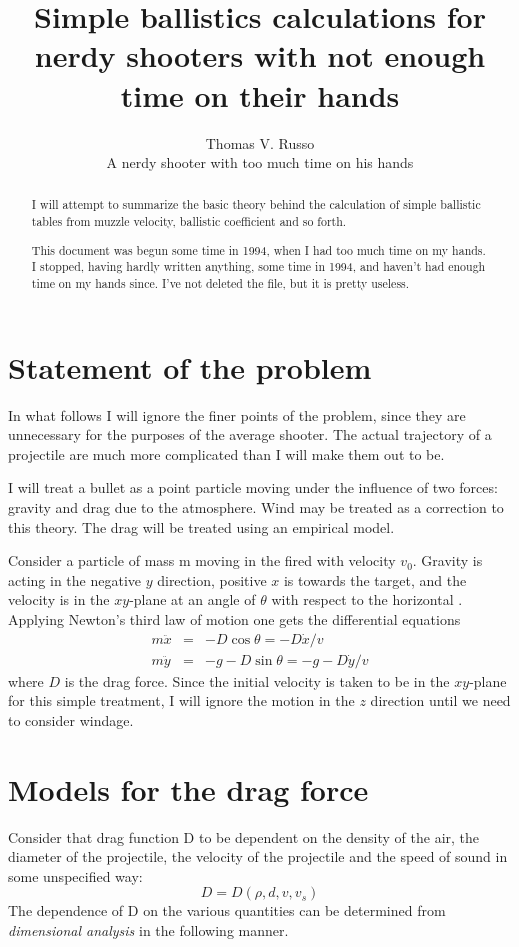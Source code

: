 
\author{Thomas V. Russo\\A nerdy shooter with too much time on his hands}
\title{Simple ballistics calculations for nerdy shooters with not
enough time on their hands}
\maketitle
\begin{abstract}
I will attempt to summarize the basic theory behind the calculation of
simple ballistic tables from muzzle velocity, ballistic coefficient
and so forth.

This document was begun some time in 1994, when I had too much time on
my hands.  I stopped, having hardly written anything, some time in
1994, and haven't had enough time on my hands since.  I've not deleted
the file, but it is pretty useless.
\end{abstract}
\section{Statement of the problem}
In what follows I will ignore the finer points of the problem, since
they are unnecessary for the purposes of the average shooter.  The
actual trajectory of a projectile are much more complicated than I
will make them out to be.  

I will treat a bullet as a point particle moving under the influence
of two forces: gravity and drag due to the atmosphere. Wind may be
treated as a correction to this theory.  The drag will be treated
using an empirical model.

Consider a particle of mass m moving in the fired with velocity $v_0$.
Gravity is acting in the negative $y$ direction, positive $x$ is
towards the target, and the velocity is in the $xy$-plane at an angle
of $\theta$ with respect to the horizontal .  Applying Newton's third
law of motion one gets the differential equations
\begin{eqnarray}
\label{eq:newton-3}
m\ddot{x} &=& -D\cos\theta =-D \dot{x}/v\\
m\ddot{y} &=& -g - D\sin\theta = -g - D \dot{y}/v 
\end{eqnarray}
where $D$ is the drag force.  Since the initial velocity is taken
to be in the $xy$-plane for this simple treatment, I will ignore the
motion in the $z$ direction until we need to consider windage.

\section{Models for the drag force}
Consider that drag function D to be dependent on the density of the
air, the diameter of the projectile, the velocity of the projectile
and the speed of sound in some unspecified way:
\begin{equation} D=D(\rho,d,v,v_s) \end{equation}
The dependence of D on the various quantities can be determined from
{\em dimensional analysis} in the following manner.

